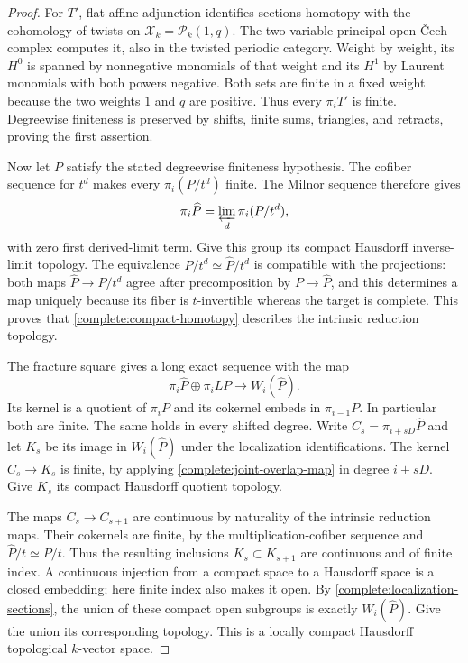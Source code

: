 \begin{proof}
For $T'$, flat affine adjunction identifies sections-homotopy with
the cohomology of twists on
$\mathcal X_k=\mathcal P_k(1,q)$. The two-variable principal-open
\v Cech complex computes it, also in the twisted periodic category.
Weight by weight, its $H^0$ is spanned by nonnegative monomials of
that weight and its $H^1$ by Laurent monomials with both powers
negative. Both sets are finite in a fixed weight because the two
weights $1$ and $q$ are positive. Thus every $\pi_iT'$ is finite.
Degreewise finiteness is preserved by shifts, finite sums, triangles,
and retracts, proving the first assertion.

Now let $P$ satisfy the stated degreewise finiteness hypothesis.
The cofiber sequence for $t^d$ makes every $\pi_i(P/t^d)$ finite.
The Milnor sequence therefore gives
\begin{equation}
\label{complete:compact-homotopy}
 \pi_i\widehat P=\varprojlim_d\pi_i(P/t^d),
\end{equation}
with zero first derived-limit term. Give this group its compact
Hausdorff inverse-limit topology. The equivalence
$P/t^d\simeq\widehat P/t^d$ is compatible with the projections:
both maps $\widehat P\to P/t^d$ agree after precomposition by
$P\to\widehat P$, and this determines a map uniquely because
its fiber is $t$-invertible whereas the target is complete. This
proves that \eqref{complete:compact-homotopy} describes the intrinsic
reduction topology.

The fracture square gives a long exact sequence with the map
\begin{equation}
\label{complete:joint-overlap-map}
 \pi_i\widehat P\oplus\pi_iLP
        \longrightarrow W_i(\widehat P).
\end{equation}
Its kernel is a quotient of $\pi_iP$ and its cokernel embeds in
$\pi_{i-1}P$. In particular both are finite. The same holds in
every shifted degree. Write $C_s=\pi_{i+sD}\widehat P$ and let
$K_s$ be its image in $W_i(\widehat P)$ under the localization
identifications. The kernel $C_s\to K_s$ is finite, by applying
\eqref{complete:joint-overlap-map} in degree $i+sD$. Give $K_s$
its compact Hausdorff quotient topology.

The maps $C_s\to C_{s+1}$ are continuous by naturality of the
intrinsic reduction maps. Their cokernels are finite, by the
multiplication-cofiber sequence and
$\widehat P/t\simeq P/t$. Thus the resulting inclusions
$K_s\subset K_{s+1}$ are continuous and of finite index. A
continuous injection from a compact space to a Hausdorff space is
a closed embedding; here finite index also makes it open. By
\eqref{complete:localization-sections}, the union of these compact
open subgroups is exactly $W_i(\widehat P)$. Give the union its
corresponding topology. This is a locally compact Hausdorff
topological $k$-vector space.


\end{proof}
